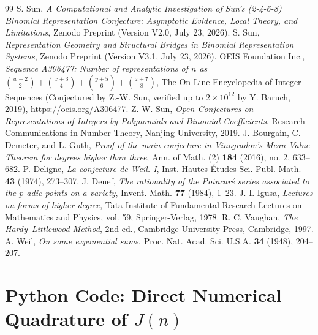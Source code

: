 \documentclass[11pt, a4paper]{article}
\theoremstyle{plain}
\theoremstyle{definition}
\begin{document}
\begin{thebibliography}{99}
 S. Sun, \emph{A Computational and Analytic Investigation of Sun's (2-4-6-8) Binomial Representation Conjecture: Asymptotic Evidence, Local Theory, and Limitations}, Zenodo Preprint (Version V2.0, July 23, 2026).
 S. Sun, \emph{Representation Geometry and Structural Bridges in Binomial Representation Systems}, Zenodo Preprint (Version V3.1, July 23, 2026).
 OEIS Foundation Inc., \emph{Sequence A306477: Number of representations of $n$ as $\binom{w+2}{2} + \binom{x+3}{4} + \binom{y+5}{6} + \binom{z+7}{8}$}, The On-Line Encyclopedia of Integer Sequences (Conjectured by Z.-W. Sun, verified up to $2 \times 10^{12}$ by Y. Baruch, 2019), \url{https://oeis.org/A306477}.
 Z.-W. Sun, \emph{Open Conjectures on Representations of Integers by Polynomials and Binomial Coefficients}, Research Communications in Number Theory, Nanjing University, 2019.
 J. Bourgain, C. Demeter, and L. Guth, \emph{Proof of the main conjecture in Vinogradov's Mean Value Theorem for degrees higher than three}, Ann. of Math. (2) \textbf{184} (2016), no. 2, 633--682.
 P. Deligne, \emph{La conjecture de Weil. I}, Inst. Hautes \'Etudes Sci. Publ. Math. \textbf{43} (1974), 273--307.
 J. Denef, \emph{The rationality of the Poincar\'e series associated to the $p$-adic points on a variety}, Invent. Math. \textbf{77} (1984), 1--23.
 J.-I. Igusa, \emph{Lectures on forms of higher degree}, Tata Institute of Fundamental Research Lectures on Mathematics and Physics, vol. 59, Springer-Verlag, 1978.
 R. C. Vaughan, \emph{The Hardy--Littlewood Method}, 2nd ed., Cambridge University Press, Cambridge, 1997.
 A. Weil, \emph{On some exponential sums}, Proc. Nat. Acad. Sci. U.S.A. \textbf{34} (1948), 204--207.
\end{thebibliography}

\appendix

\section{Python Code: Direct Numerical Quadrature of $J(n)$}
\label{app:quadrature}
\end{document}
